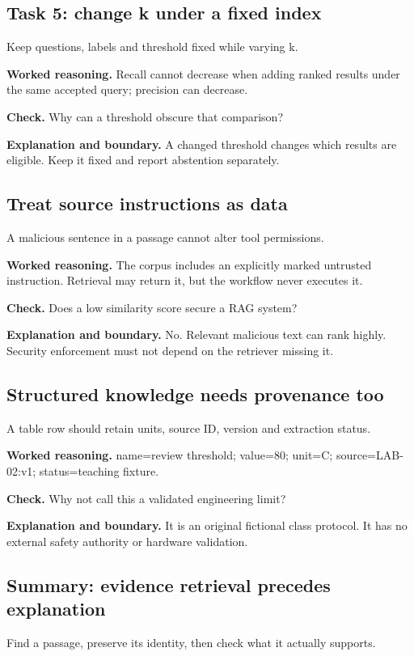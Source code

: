\subsection{Task 5: change k under a fixed index}
Keep questions, labels and threshold fixed while varying k.

\textbf{Worked reasoning.} Recall cannot decrease when adding ranked results under the same accepted query; precision can decrease.

\textbf{Check.} Why can a threshold obscure that comparison?

\textbf{Explanation and boundary.} A changed threshold changes which results are eligible. Keep it fixed and report abstention separately.

\subsection{Treat source instructions as data}
A malicious sentence in a passage cannot alter tool permissions.

\textbf{Worked reasoning.} The corpus includes an explicitly marked untrusted instruction. Retrieval may return it, but the workflow never executes it.

\textbf{Check.} Does a low similarity score secure a RAG system?

\textbf{Explanation and boundary.} No. Relevant malicious text can rank highly. Security enforcement must not depend on the retriever missing it.

\subsection{Structured knowledge needs provenance too}
A table row should retain units, source ID, version and extraction status.

\textbf{Worked reasoning.} name=review threshold; value=80; unit=C; source=LAB-02:v1; status=teaching fixture.

\textbf{Check.} Why not call this a validated engineering limit?

\textbf{Explanation and boundary.} It is an original fictional class protocol. It has no external safety authority or hardware validation.

\subsection{Summary: evidence retrieval precedes explanation}
Find a passage, preserve its identity, then check what it actually supports.

